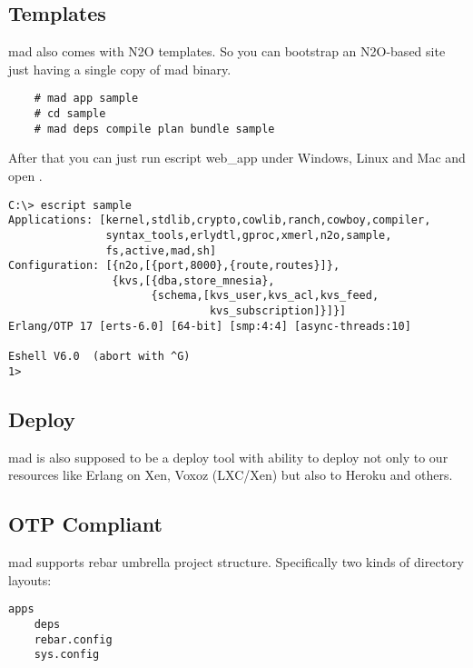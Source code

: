 \subsection{Templates}

mad also comes with N2O templates. So you can bootstrap an N2O-based site
just having a single copy of mad binary.

\vspace{1\baselineskip}
\begin{lstlisting}
    # mad app sample
    # cd sample
    # mad deps compile plan bundle sample
\end{lstlisting}
\vspace{1\baselineskip}

After that you can just run escript web\_app under Windows, Linux and
Mac and open .

\vspace{1\baselineskip}
\begin{lstlisting}
C:\> escript sample
Applications: [kernel,stdlib,crypto,cowlib,ranch,cowboy,compiler,
               syntax_tools,erlydtl,gproc,xmerl,n2o,sample,
               fs,active,mad,sh]
Configuration: [{n2o,[{port,8000},{route,routes}]},
                {kvs,[{dba,store_mnesia},
                      {schema,[kvs_user,kvs_acl,kvs_feed,
                               kvs_subscription]}]}]
Erlang/OTP 17 [erts-6.0] [64-bit] [smp:4:4] [async-threads:10]

Eshell V6.0  (abort with ^G)
1>
\end{lstlisting}
\vspace{1\baselineskip}

\subsection{Deploy}

mad is also supposed to be a deploy tool with ability to
deploy not only to our resources like Erlang on Xen, Voxoz (LXC/Xen) but
also to Heroku and others.

\subsection{OTP Compliant}

mad supports rebar umbrella project structure.
Specifically two kinds of directory layouts:

\begin{lstlisting}[caption=Solution]
    apps
    deps
    rebar.config
    sys.config
\end{lstlisting}

